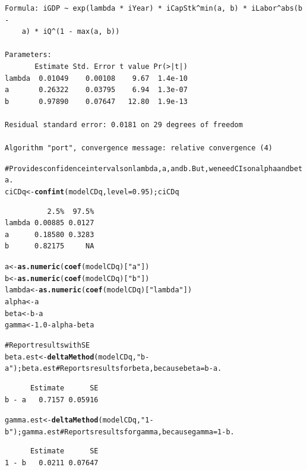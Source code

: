 \documentclass[10pt]{article}\usepackage{graphicx, color}
\makeatletter
\newcommand{\hlfunctioncall}[1]{\textcolor[rgb]{0.501960784313725,0,0.329411764705882}{\textbf{#1}}}%
\newcommand{\hlstring}[1]{\textcolor[rgb]{0.6,0.6,1}{#1}}%
\newcommand{\hlcomment}[1]{\textcolor[rgb]{0.180392156862745,0.6,0.341176470588235}{#1}}%
\newenvironment{kframe}{%
 \def\at@end@of@kframe{}%
 \ifinner\ifhmode%
  \def\at@end@of@kframe{\end{minipage}}%
  \begin{minipage}{\columnwidth}%
 \fi\fi%
 \def\FrameCommand##1{\hskip\@totalleftmargin \hskip-\fboxsep
 \colorbox{shadecolor}{##1}\hskip-\fboxsep
     \hskip-\linewidth \hskip-\@totalleftmargin \hskip\columnwidth}%
 \MakeFramed {\advance\hsize-\width
   \@totalleftmargin\z@ \linewidth\hsize
   \@setminipage}}%
 {\par\unskip\endMakeFramed%
 \at@end@of@kframe}
\newenvironment{knitrout}{}{} %
\makeatother
\begin{document}
\begin{knitrout}
\begin{kframe}
\begin{verbatim}
Formula: iGDP ~ exp(lambda * iYear) * iCapStk^min(a, b) * iLabor^abs(b - 
    a) * iQ^(1 - max(a, b))

Parameters:
       Estimate Std. Error t value Pr(>|t|)
lambda  0.01049    0.00108    9.67  1.4e-10
a       0.26322    0.03795    6.94  1.3e-07
b       0.97890    0.07647   12.80  1.9e-13

Residual standard error: 0.0181 on 29 degrees of freedom

Algorithm "port", convergence message: relative convergence (4) 
\end{verbatim}
\begin{alltt}

\hlcomment{# Provides confidence intervals on lambda, a, and b. But, we need CIs on alpha and beta.}
ciCDq <- \hlfunctioncall{confint}(modelCDq, level = 0.95); ciCDq 
\end{alltt}


{\ttfamily\noindent\itshape\color{messagecolor}{Waiting for profiling to be done...}}\begin{verbatim}
          2.5%  97.5%
lambda 0.00885 0.0127
a      0.18580 0.3283
b      0.82175     NA
\end{verbatim}
\begin{alltt}

a <- \hlfunctioncall{as.numeric}(\hlfunctioncall{coef}(modelCDq)[\hlstring{"a"}])
b <- \hlfunctioncall{as.numeric}(\hlfunctioncall{coef}(modelCDq)[\hlstring{"b"}])
lambda <- \hlfunctioncall{as.numeric}(\hlfunctioncall{coef}(modelCDq)[\hlstring{"lambda"}])
alpha <- a
beta <- b - a
gamma <- 1.0 - alpha - beta

\hlcomment{# Report results with SE}
beta.est <- \hlfunctioncall{deltaMethod}(modelCDq, \hlstring{"b-a"}); beta.est # Reports results for beta, because beta = b - a.
\end{alltt}
\begin{verbatim}
      Estimate      SE
b - a   0.7157 0.05916
\end{verbatim}
\begin{alltt}
gamma.est <- \hlfunctioncall{deltaMethod}(modelCDq, \hlstring{"1-b"}); gamma.est # Reports results for gamma, because gamma = 1 - b.
\end{alltt}
\begin{verbatim}
      Estimate      SE
1 - b   0.0211 0.07647
\end{verbatim}
\begin{alltt}


\end{alltt}
\end{kframe}
\end{knitrout}
\end{document}
